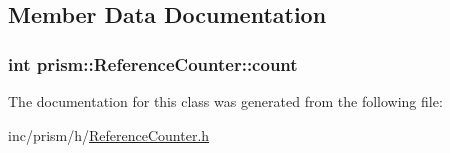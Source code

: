 \subsection{Member Data Documentation}
\subsubsection[{\texorpdfstring{count}{count}}]{\setlength{\rightskip}{0pt plus 5cm}int prism\+::\+Reference\+Counter\+::count}\hypertarget{classprism_1_1_reference_counter_a18e28845491bc0d8632a4075c8f341a9}{}\label{classprism_1_1_reference_counter_a18e28845491bc0d8632a4075c8f341a9}


The documentation for this class was generated from the following file\+:\begin{DoxyCompactItemize}
\item 
inc/prism/h/\hyperlink{_reference_counter_8h}{Reference\+Counter.\+h}\end{DoxyCompactItemize}
